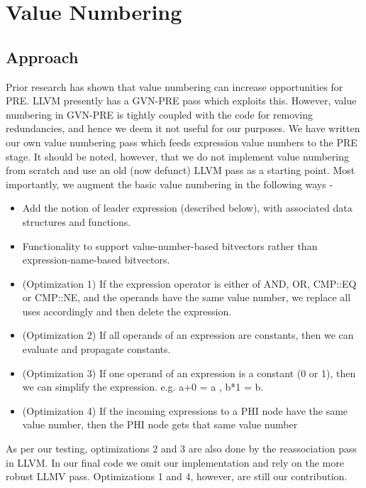 \chapter{Value Numbering} \label{ch:vn}

\section{Approach}
Prior research has shown that value numbering can increase opportunities for PRE.
LLVM presently has a GVN-PRE pass which exploits this. However, value numbering in 
GVN-PRE is tightly coupled with the code for removing redundancies, and hence
we deem it not useful for our purposes. We have written our own value numbering
pass which feeds expression value numbers to the PRE stage. It should be noted,
     however, that we do not implement value numbering from scratch and use an
     old (now defunct) LLVM pass as a starting point. Most importantly, we
     augment the basic value numbering in the following ways - 
     
\begin{itemize}     
  \item Add the notion of leader expression (described below), with associated
  data structures and functions. 
  \item Functionality to support value-number-based bitvectors rather than
  expression-name-based bitvectors. 
  \item (Optimization 1) If the expression operator is either of AND, OR, CMP::EQ
  or CMP::NE, and the operands have the same value number, we replace all uses
  accordingly and then delete the expression.
  \item (Optimization 2) If all operands of an expression are constants, then we can 
  evaluate and propagate constants. 
  \item (Optimization 3) If one operand of an expression is a constant (0 or 1), then 
  we can simplify the expression. e.g. {a+0 = a} , {b*1 = b}.
  \item (Optimization 4) If the incoming expressions to a PHI node have the same value 
  number, then the PHI node gets that same value number
\end{itemize}  
  As per our testing, optimizations 2 and 3 are also done by the reassociation
  pass in LLVM. In our final code we omit our implementation and rely on the
  more robust LLMV pass. Optimizations 1 and 4, however, are still our contribution.

